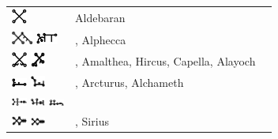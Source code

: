 \documentclass[british,final,landscape]{scrartcl}
\begin{document}
\begin{refsection}
 \tablelasttail{\bottomrule}
 \begin{supertabular}{p{0.3\textwidth}p{0.34\textwidth}p{0.34\textwidth}}
  \includegraphics[width=5mm]{Astrology/Aldebaran}        & Aldebaran  &  \\
  \includegraphics[width=7mm]{Astrology/Alphecca} \includegraphics[width=7mm]{Astrology/Alphecca2} & ,  Alphecca  &  \\
  \includegraphics[width=5mm]{Astrology/Amalthea} \includegraphics[width=5mm]{Astrology/Capella} & , Amalthea, Hircus, Capella, Alayoch   &  \\
  \includegraphics[width=5mm]{Astrology/Arcturus} \includegraphics[width=5mm]{Astrology/Arcturus2} & , Arcturus, Alchameth  &  \\
  \includegraphics[width=5mm]{Astrology/betaPersei} \includegraphics[width=5mm]{Astrology/betaPersei2} \includegraphics[width=5mm]{Astrology/betaPersei3} &  & \\
  \includegraphics[width=5mm]{Astrology/CanisMajor} \includegraphics[width=5mm]{Astrology/CanisMajor2} & , Sirius & \\

\end{supertabular}
\end{refsection}
\end{document}
